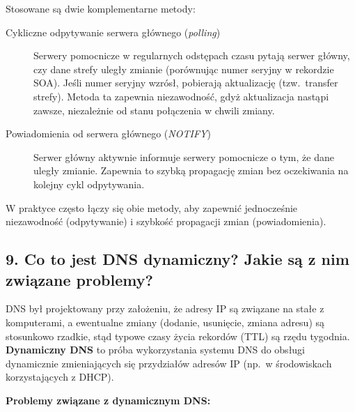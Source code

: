 \documentclass[12pt,a4paper]{article}
\begin{document}
Stosowane są dwie komplementarne metody:

\begin{description}
  \item[Cykliczne odpytywanie serwera głównego (\emph{polling})]
        Serwery pomocnicze w regularnych odstępach czasu pytają serwer główny,
        czy dane strefy uległy zmianie (porównując numer seryjny w rekordzie SOA).
        Jeśli numer seryjny wzrósł, pobierają aktualizację (tzw.\ transfer strefy).
        Metoda ta zapewnia niezawodność, gdyż aktualizacja nastąpi zawsze, niezależnie
        od stanu połączenia w chwili zmiany.
  \item[Powiadomienia od serwera głównego (\emph{NOTIFY})]
        Serwer główny aktywnie informuje serwery pomocnicze o tym, że dane uległy
        zmianie. Zapewnia to szybką propagację zmian bez oczekiwania na kolejny
        cykl odpytywania.
\end{description}

W praktyce często łączy się obie metody, aby zapewnić jednocześnie niezawodność
(odpytywanie) i szybkość propagacji zmian (powiadomienia).

\subsection*{9. Co to jest DNS dynamiczny? Jakie są z nim związane problemy?}

DNS był projektowany przy założeniu, że adresy IP są związane na stałe z komputerami,
a ewentualne zmiany (dodanie, usunięcie, zmiana adresu) są stosunkowo rzadkie, stąd
typowe czasy życia rekordów (TTL) są rzędu tygodnia. \textbf{Dynamiczny DNS} to próba
wykorzystania systemu DNS do obsługi dynamicznie zmieniających się przydziałów
adresów IP (np.\ w środowiskach korzystających z DHCP).

\textbf{Problemy związane z dynamicznym DNS:}
\end{document}
